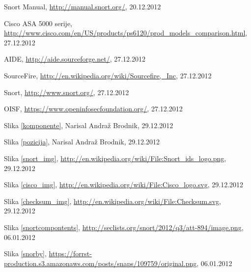 \documentclass[12pt]{article}
\begin{document}
\clearpage
{}
\begin{thebibliography}{9}


Snort Manual, \url{http://manual.snort.org/}, 20.12.2012

Cisco ASA 5000 serije, \url{http://www.cisco.com/en/US/products/ps6120/prod_models_comparison.html}, 27.12.2012

AIDE, \url{http://aide.sourceforge.net/}, 27.12.2012

SourceFire, \url{http://en.wikipedia.org/wiki/Sourcefire,_Inc}, 27.12.2012

Snort, \url{http://www.snort.org/}, 27.12.2012

OISF, \url{https://www.openinfosecfoundation.org/}, 27.12.2012

Slika \ref{komponente}, 
Narisal Andraž Brodnik, 29.12.2012

Slika \ref{pozicija}, 
Narisal Andraž Brodnik, 29.12.2012

Slika \ref{snort_img}, 
\url{http://en.wikipedia.org/wiki/File:Snort_ids_logo.png}, 29.12.2012

Slika \ref{cisco_img}, 
\url{http://en.wikipedia.org/wiki/File:Cisco_logo.svg}, 29.12.2012

 Slika \ref{checksum_img}, 
\url{http://en.wikipedia.org/wiki/File:Checksum.svg}, 29.12.2012

Slika \ref{snortcompontents}, \url{http://seclists.org/snort/2012/q3/att-894/image.png}, 06.01.2012

Slika \ref{snorby}, \url{https://forrst-production.s3.amazonaws.com/posts/snaps/109759/original.png}, 06.01.2012

\end{thebibliography}
\end{document}
